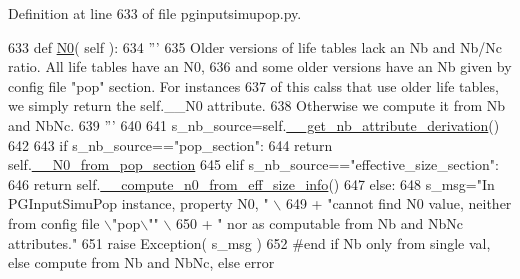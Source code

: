 Definition at line 633 of file pginputsimupop.\+py.


\begin{DoxyCode}
633     \textcolor{keyword}{def }\hyperlink{classnegui_1_1pginputsimupop_1_1PGInputSimuPop_a7fd0bd28a9b4b0468f704db0ac882310}{N0}( self ):
634         \textcolor{stringliteral}{'''}
635 \textcolor{stringliteral}{        Older versions of life tables lack an Nb and Nb/Nc ratio.  All life tables have an N0,}
636 \textcolor{stringliteral}{        and some older versions have an Nb given by config file "pop" section.  For instances }
637 \textcolor{stringliteral}{        of this calss that use older life tables, we simply return the self.\_\_N0 attribute.  }
638 \textcolor{stringliteral}{        Otherwise we compute it from Nb and NbNc.}
639 \textcolor{stringliteral}{        '''}
640 
641         s\_nb\_source=self.\hyperlink{classnegui_1_1pginputsimupop_1_1PGInputSimuPop_ab22ca7220fa560cf8c7b4d8b6bcb87f3}{\_\_get\_nb\_attribute\_derivation}()
642 
643         \textcolor{keywordflow}{if} s\_nb\_source==\textcolor{stringliteral}{"pop\_section"}:
644             \textcolor{keywordflow}{return} self.\hyperlink{classnegui_1_1pginputsimupop_1_1PGInputSimuPop_af25160fc2d3417eb257a7ab28f6bc19d}{\_\_N0\_from\_pop\_section}
645         \textcolor{keywordflow}{elif} s\_nb\_source==\textcolor{stringliteral}{"effective\_size\_section"}:         
646             \textcolor{keywordflow}{return} self.\hyperlink{classnegui_1_1pginputsimupop_1_1PGInputSimuPop_abd206373a3765732d391dfb291398b57}{\_\_compute\_n0\_from\_eff\_size\_info}()
647         \textcolor{keywordflow}{else}:
648             s\_msg=\textcolor{stringliteral}{"In PGInputSimuPop instance, property N0, "} \(\backslash\)
649                     + \textcolor{stringliteral}{"cannot find N0 value, neither from config file \(\backslash\)"pop\(\backslash\)""} \(\backslash\)
650                     + \textcolor{stringliteral}{" nor as computable from Nb and NbNc attributes."}
651             \textcolor{keywordflow}{raise} Exception( s\_msg )
652         \textcolor{comment}{#end if Nb only from single val, else compute from Nb and NbNc, else error}
\end{DoxyCode}

